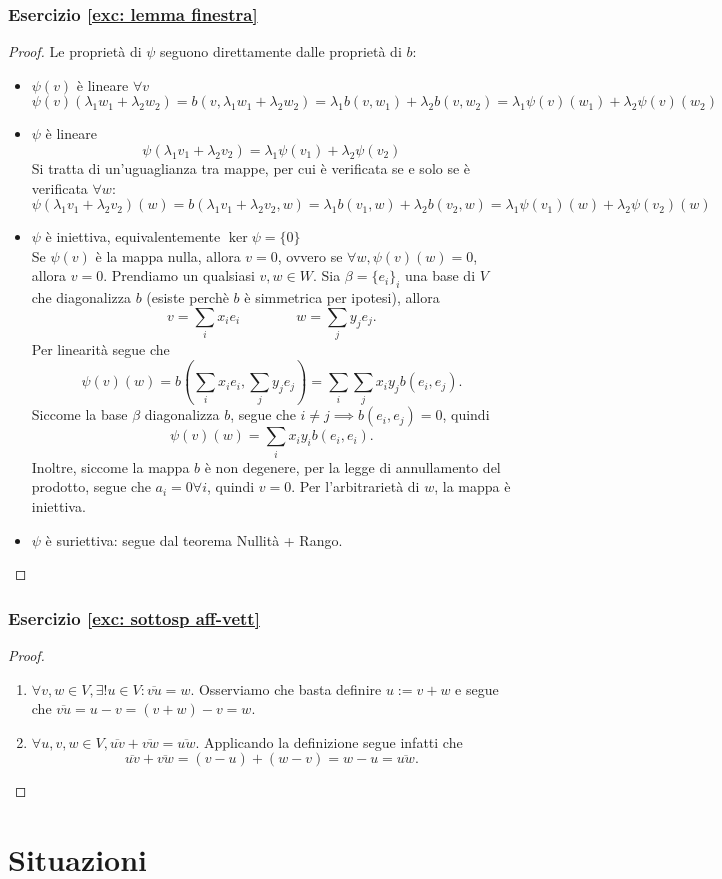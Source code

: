 \documentclass{article}     %
\begin{document}
\subsubsection*{Esercizio \ref{exc: lemma finestra}}\label{sol: lemma finestra}
\begin{proof}Le proprietà di $\psi$ seguono direttamente dalle proprietà di $b$:
    \begin{itemize}
        \item $\psi(v)$ è lineare $\forall v$
            \[\psi(v)(\lambda_1w_1+\lambda_2w_2)=b(v,\lambda_1w_1+\lambda_2w_2)= \lambda_1b(v,w_1)+\lambda_2b(v,w_2) = \lambda_1\psi(v)(w_1)+\lambda_2\psi(v)(w_2) \]
        \item  $\psi$ è lineare
        \[\psi(\lambda_1v_1+\lambda_2v_2)=\lambda_1\psi(v_1)+\lambda_2\psi(v_2)\]
        Si tratta di un'uguaglianza tra mappe, per cui è verificata se e solo se è verificata $\forall w$:
        \[\psi(\lambda_1v_1+\lambda_2v_2)(w)= b(\lambda_1v_1+\lambda_2v_2,w)= \lambda_1b(v_1,w)+\lambda_2b(v_2,w)= \lambda_1\psi(v_1)(w)+\lambda_2\psi(v_2)(w)\]
        \item $\psi$ è iniettiva, equivalentemente $\ker \psi =\{0\}$
        \\Se $\psi(v)$ è la mappa nulla, allora $v=0$, ovvero se $\forall w, \psi(v)(w)=0$, allora $v=0$.
        Prendiamo un qualsiasi $v,w\in W$. Sia $\beta=\{e_i\}_i$ una base di $V$ che diagonalizza $b$ (esiste perchè $b$ è simmetrica per ipotesi), allora
        \[v=\sum_ix_ie_i\qquad \qquad w=\sum_jy_je_j.\]
        Per linearità segue che
        \[\psi(v)(w)=b\left(\sum_ix_ie_i, \sum_jy_je_j\right)=\sum_i\sum_jx_iy_jb(e_i,e_j).\]
        Siccome la base $\beta$ diagonalizza $b$, segue che $i\neq j\implies b(e_i,e_j)=0$, quindi 
        \[\psi(v)(w)=\sum_ix_iy_ib(e_i,e_i).\]
        Inoltre, siccome la mappa $b$ è non degenere, per la legge di annullamento del prodotto, segue che $a_i=0\forall i$, quindi $v=0$. Per l'arbitrarietà di $w$, la mappa è iniettiva.
        \item $\psi$ è suriettiva: segue dal teorema Nullità + Rango.
    \end{itemize}
\end{proof}

\subsubsection*{Esercizio \ref{exc: sottosp aff-vett}}\label{sol: sottosp aff-vett}
\begin{proof}~
    \begin{enumerate}[label=$\roman*)$]
        \item $\forall v,w\in V,\exists!u\in V:\overline{vu}=w$. Osserviamo che basta definire $u:=v+w$ e segue che $\overline{vu}=u-v=(v+w)-v=w$.
        \item $\forall u,v,w\in V, \overline{uv}+\overline{vw}=\overline{uw}$. Applicando la definizione segue infatti che 
        \[\overline{uv}+\overline{vw}= (v-u)+(w-v)=w-u=\overline{uw}.\]
    \end{enumerate}
\end{proof}

\newpage
\section{Situazioni}
\printtheorems
\end{document}
